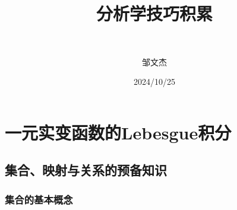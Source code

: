 \documentclass[lang=cn,newtx,10pt,scheme=chinese]{../Template/elegantbook}
\title{分析学技巧积累}
\subtitle{\,\,}
\author{邹文杰}
\institute{无}
\date{2024/10/25}
\begin{document}
\maketitle
\frontmatter

\tableofcontents

\mainmatter
\everymath{\displaystyle} %


\part{一元实变函数的Lebesgue积分}

\chapter{集合、映射与关系的预备知识}

\section{集合的基本概念}
\end{document}
